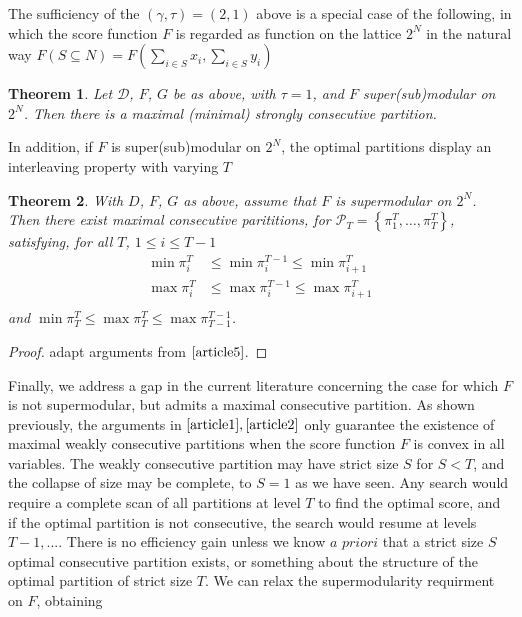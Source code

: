 \documentclass{article}
\newtheorem{thm}{Theorem}
\theoremstyle{case}
\begin{document}
The sufficiency of the $\left( \gamma, \tau\right) = \left( 2,1\right)$ above is a special case of the following, in which the score function $F$ is regarded as function on the lattice $2^N$ in the natural way $F\left( S \subseteq N\right) = F\left( \sum_{i \in S} x_i, \sum_{i \in S} y_i\right)$

\begin{thm} \label{thm1}
Let $\mathcal{D}$, $F$, $G$ be as above, with $\tau = 1$, and $F$ super(sub)modular on $2^N$. Then there is a maximal (minimal) strongly consecutive partition. 
\end{thm}

In addition, if $F$ is super(sub)modular on $2^N$, the optimal partitions display an interleaving property with varying $T$
\begin{thm} \label{thm2}
With $D$, $F$, $G$ as above, assume that $F$ is supermodular on $2^N$. Then there exist maximal consecutive parititions, for $\mathcal{P}_T = \left\lbrace \pi_1^T, \dots, \pi_T^T\right\rbrace$, satisfying, for all $T$, $1 \leq i \leq T-1$
\begin{align*}
\min{\pi_i^T} &\leq \min{\pi_i^{T-1}} \leq \min{\pi_{i+1}^T} \\
\max{\pi_i^T} &\leq \max{\pi_i^{T-1}} \leq \max{\pi_{i+1}^T} \\
\end{align*}
and $\min{\pi_T^T} \leq \max{\pi_T^T} \leq \max{\pi_{T-1}^{T-1}}$.
\end{thm}
\begin{proof}
adapt arguments from $\cite{article5}$.
\end{proof}

Finally, we address a gap in the current literature concerning the case for which $F$ is not supermodular, but admits a maximal consecutive partition. As shown previously, the arguments in $\cite{article1}, \cite{article2}$ only guarantee the existence of maximal weakly consecutive partitions when the score function $F$ is convex in all variables. The weakly consecutive partition may have strict size $S$ for $S < T$, and the collapse of size may be complete, to $S = 1$ as we have seen. Any search would require a complete scan of all partitions at level $T$ to find the optimal score, and if the optimal partition is not consecutive, the search would resume at levels $T-1, ...$. There is no efficiency gain unless we know $\textit{a priori}$ that a strict size $S$ optimal consecutive partition exists, or something about the structure of the optimal partition of strict size $T$. We can relax the supermodularity requirment on $F$, obtaining
\end{document}
